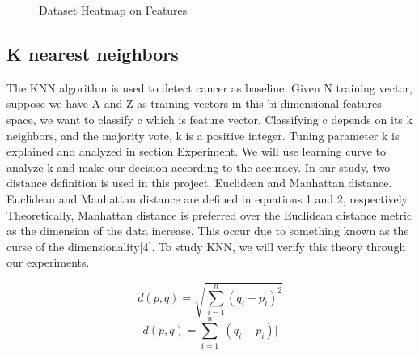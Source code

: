 \documentclass{article} %
\begin{document}
\begin{figure}[ht]
\begin{center}
\caption{Dataset Heatmap on Features}
\end{center}
\end{figure}

\subsection{K nearest neighbors}
The KNN algorithm is used to detect cancer as baseline. Given N training vector, suppose we
have A and Z as training vectors in this bi-dimensional features space, we want to classify c which is feature vector. Classifying c depends on its k neighbors, and the majority vote, k is a positive integer. Tuning parameter k is explained and analyzed in section Experiment. We will use learning curve to analyze k and make our decision according to the accuracy. In our study, two distance definition is used in this project, Euclidean and Manhattan distance. Euclidean and Manhattan distance are defined in equations 1 and 2, respectively. Theoretically, Manhattan distance is preferred over the Euclidean distance metric as the dimension of the data increase. This occur due to something known as the curse of the dimensionality[4]. To study KNN, we will verify this theory through our experiments.

\begin{equation}
 d\left(p,q\right) = \sqrt {\sum _{i=1}^{n}  \left( q_{i} - p_{i}\right)^2 } 
\end{equation}
\begin{equation}
 d\left(p,q\right) = \sum _{i=1}^{n} \lvert \left( q_{i} - p_{i}\right) \rvert
\end{equation}
\end{document}
